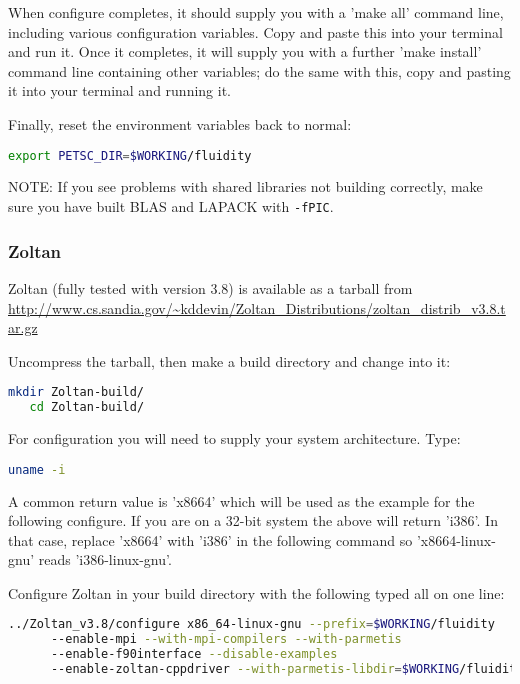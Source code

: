 When configure completes, it should supply you with a 'make all' command line,
including various configuration variables. Copy and paste this into your
terminal and run it. Once it completes, it will supply you with a further 'make
install' command line containing other variables; do the same with this, copy
and pasting it into your terminal and running it. 

Finally, reset the environment variables back to normal:

\begin{lstlisting}[language=bash]
export PETSC_DIR=$WORKING/fluidity
\end{lstlisting}

NOTE: If you see problems with shared libraries not building correctly, make
sure you have built BLAS and LAPACK with \lstinline[language=bash]+-fPIC+.

\subsubsection{Zoltan}
\label{sec:required_libraries_numerical_zoltan}

Zoltan (fully tested with version 3.8) is available as a tarball from  
\url{http://www.cs.sandia.gov/~kddevin/Zoltan_Distributions/zoltan_distrib_v3.8.tar.gz}

Uncompress the tarball, then make a build directory and change into it:

\begin{lstlisting}[language=bash]
   mkdir Zoltan-build/
   cd Zoltan-build/
\end{lstlisting}

For configuration you will need to supply your system architecture. Type:

\begin{lstlisting}[language=bash]
   uname -i
\end{lstlisting}

A common return value is 'x86{\textunderscore}64' which will be used as the
example for the following configure. If you are on a 32-bit system the above
will return 'i386'. In that case, replace 'x86{\textunderscore}64' with 'i386' in
the following command so 'x86{\textunderscore}64-linux-gnu' reads
'i386-linux-gnu'.

Configure Zoltan in your build directory with the following typed all on one
line:

\begin{lstlisting}[language=bash]
   ../Zoltan_v3.8/configure x86_64-linux-gnu --prefix=$WORKING/fluidity
      --enable-mpi --with-mpi-compilers --with-parmetis
      --enable-f90interface --disable-examples
      --enable-zoltan-cppdriver --with-parmetis-libdir=$WORKING/fluidity/lib
\end{lstlisting}

